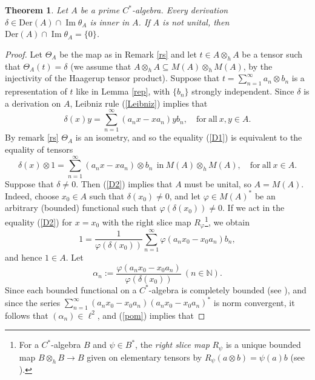 \documentclass[]{amsart}
\newtheorem{theorem}{Theorem}[section]
\theoremstyle{remark}
\theoremstyle{definition}
\theoremstyle{question}
\numberwithin{equation}{section}
\begin{document}
\begin{theorem}\label{prime} Let $A$ be a prime $C^*$-algebra. Every derivation $\delta \in
\mathrm{Der}(A) \cap {\mathop{\mathrm{Im}}} \theta_A$ is inner in $A$. If $A$ is
not unital, then $\mathrm{Der}(A) \cap {\mathop{\mathrm{Im}}} \theta_A=\{0\}$.
 \end{theorem}
 \begin{proof}
Let $\Theta_A$ be the map as in Remark \ref{rs} and let $t \in A \otimes_h A$ be a tensor such that $\Theta_{A}(t)= \delta$ (we assume that $A\otimes_h A \subseteq M(A)\otimes_h M(A)$, by the injectivity of the Haagerup tensor product). Suppose that $t=\sum_{n=1}^\infty a_n \otimes b_n$ is a representation of
$t$ like in Lemma \ref{rep}, with  $\{b_n\}$ strongly independent. Since $\delta$
is a derivation on $A$, Leibniz rule (\ref{Leibniz}) implies that
\begin{equation}\label{D1}
\delta(x)y=\sum_{n=1}^\infty(a_nx-xa_n)yb_n, \quad  \mathrm{for} \ \mathrm{all}
\ x,y \in A.
\end{equation}
By remark \ref{rs} $\Theta_{A}$ is an isometry, and so the equality (\ref{D1}) is equivalent
to the equality of tensors
\begin{equation}\label{D2}
\delta(x) \otimes 1 = \sum_{n=1}^\infty (a_n x - xa_n) \otimes b_n  \ \
\mathrm{in} \ M(A) \otimes_h M(A), \quad  \mathrm{for} \ \mathrm{all}
\ x \in A.
\end{equation}
Suppose that $\delta \neq 0$. Then (\ref{D2}) implies that $A$ must be unital,
so $A=M(A)$. Indeed, choose $x_0 \in A$ such that $\delta(x_0)\neq
0$, and let $\varphi \in M(A)^*$ be an arbitrary (bounded) functional such that
$\varphi(\delta(x_0))\neq 0$. If we act in the equality (\ref{D2}) for $x=x_0$ with
the right slice map $R_\varphi$\footnote{For a $C^*$-algebra $B$ and $\psi \in B^*$, the \textit{right slice map} $R_\psi$ is a unique bounded map $ B\otimes_h B \to B$ given on elementary tensors by $R_\psi(a\otimes b)=\psi(a)b$ (see \cite[Section 4]{Smi}).}, we obtain
\begin{equation}\label{pom}
1=\frac{1}{\varphi(\delta(x_0))} \sum_{n=1}^\infty \varphi(a_n x_0 - x_0a_n)
b_n,
\end{equation}
and hence $1 \in A$. Let
$$\alpha_n:=\frac{\varphi(a_nx_0-x_0a_n)}{\varphi(\delta(x_0))} \ (n \in {\mathbb{N}}).$$
Since each bounded functional on a $C^*$-algebra is completely bounded (see \cite[3.8]{Paul}), and since the series
$\sum_{n=1}^\infty (a_nx_0-x_0a_n)(a_nx_0-x_0a_n)^*$ is norm convergent, it follows that $(\alpha_n)\in \ell^2$, and (\ref{pom}) implies that

\end{proof}
\end{document}
